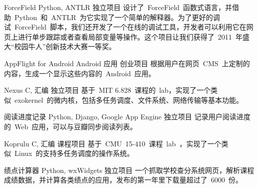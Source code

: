 \documentclass[11pt,a4paper]{moderncv}
\begin{document}
\vspace*{0.2\baselineskip}
{ForceField}
{Python, ANTLR}
{独立项目}{}
{设计了~ForceField~函数式语言，并借助~Python~和~ANTLR~为它实现了一个简单的解释器。为了更好的调试~ForceField~脚本，我们还开发了一个在线的调试工具，开发者可以利用它在网页上进行单步跟踪或者查看局部变量等操作。这个项目让我们获得了~2011~年盛大``校园牛人''创新技术大赛一等奖。}

\vspace*{0.2\baselineskip}
{AppFlight for Android}
{Android 应用}
{创业项目}{}
{根据用户在网页~CMS~上定制的内容，生成一个显示这些内容的~Android~应用。}

\vspace*{0.2\baselineskip}
{Nexus}
{C, 汇编}
{独立项目}{}
{基于~MIT 6.828~课程的~lab，实现了一个类似~exokernel~的微内核，包括多任务调度、文件系统、网络传输等基本功能。}

\vspace*{0.2\baselineskip}
{阅读进度记录}
{Python, Django, Google App Engine}
{独立项目}{}
{记录用户阅读进度的~Web~应用，可以与豆瓣同步阅读列表。}

\vspace*{0.2\baselineskip}
{Koprulu}
{C, 汇编}
{课程项目}{}
{
基于~CMU~15-410~课程~lab~，实现了一个类似~Linux~的支持多任务调度的操作系统。
}

\vspace*{0.2\baselineskip}
{绩点计算器}
{Python, wxWidgets}
{独立项目}{}
{一个抓取学校查分系统网页，解析课程成绩数据，并计算各类绩点的应用，发布的第一年里下载量超过了~6000~份。}



\end{document}
